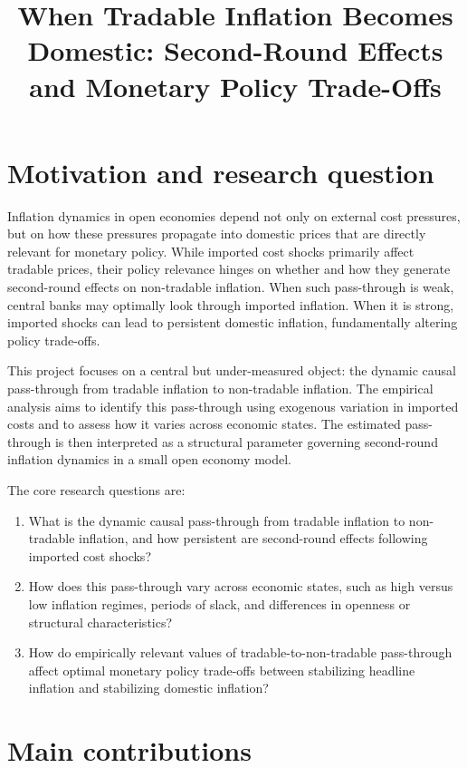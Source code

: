 \documentclass[11pt]{article}
\title{When Tradable Inflation Becomes Domestic: Second-Round Effects and Monetary Policy Trade-Offs}
\author{}
\date{}
\begin{document}
\maketitle

\section{Motivation and research question}

Inflation dynamics in open economies depend not only on external cost pressures, but on how these pressures propagate into domestic prices that are directly relevant for monetary policy. While imported cost shocks primarily affect tradable prices, their policy relevance hinges on whether and how they generate second-round effects on non-tradable inflation. When such pass-through is weak, central banks may optimally look through imported inflation. When it is strong, imported shocks can lead to persistent domestic inflation, fundamentally altering policy trade-offs.

This project focuses on a central but under-measured object: the dynamic causal pass-through from tradable inflation to non-tradable inflation. The empirical analysis aims to identify this pass-through using exogenous variation in imported costs and to assess how it varies across economic states. The estimated pass-through is then interpreted as a structural parameter governing second-round inflation dynamics in a small open economy model.

The core research questions are:

\begin{enumerate}
\item What is the dynamic causal pass-through from tradable inflation to non-tradable inflation, and how persistent are second-round effects following imported cost shocks?
\item How does this pass-through vary across economic states, such as high versus low inflation regimes, periods of slack, and differences in openness or structural characteristics?
\item How do empirically relevant values of tradable-to-non-tradable pass-through affect optimal monetary policy trade-offs between stabilizing headline inflation and stabilizing domestic inflation?
\end{enumerate}


\section{Main contributions}
\end{document}
